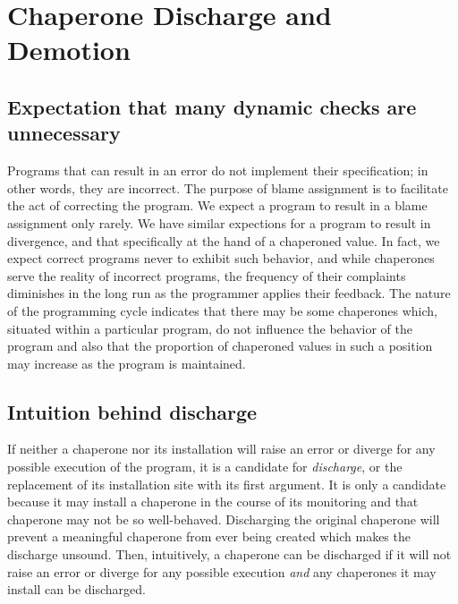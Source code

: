 \documentclass{sigplanconf}
\begin{document}


\section{Chaperone Discharge and Demotion}

\subsection{Expectation that many dynamic checks are unnecessary}

Programs that can result in an error do not implement their specification; in other words, they are incorrect.
The purpose of blame assignment is to facilitate the act of correcting the program.
We expect a program to result in a blame assignment only rarely.
We have similar expections for a program to result in divergence, and that specifically at the hand of a chaperoned value.
In fact, we expect correct programs never to exhibit such behavior, and while chaperones serve the reality of incorrect programs, the frequency of their complaints diminishes in the long run as the programmer applies their feedback.
The nature of the programming cycle indicates that there may be some chaperones which, situated within a particular program, do not influence the behavior of the program and also that the proportion of chaperoned values in such a position may increase as the program is maintained.

\subsection{Intuition behind discharge}

If neither a chaperone nor its installation will raise an error or diverge for any possible execution of the program, it is a candidate for \emph{discharge}, or the replacement of its installation site with its first argument.
It is only a candidate because it may install a chaperone in the course of its monitoring and that chaperone may not be so well-behaved.
Discharging the original chaperone will prevent a meaningful chaperone from ever being created which makes the discharge unsound.
Then, intuitively, a chaperone can be discharged if it will not raise an error or diverge for any possible execution \emph{and} any chaperones it may install can be discharged.
\end{document}

